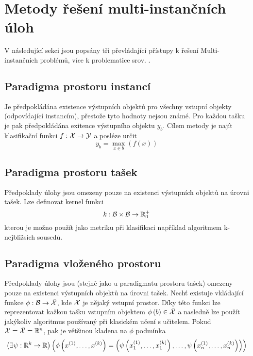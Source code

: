 \section{Metody řešení multi-instančních úloh}

V následující sekci jsou popsány tři převládající přístupy k řešení Multi-instančních problémů, více k problematice srov. \cite{pevny_using_2016}.

\subsection{Paradigma prostoru instancí}
Je předpokládána existence výstupních objektů pro všechny vstupní objekty (odpovídající instancím), přestože tyto hodnoty nejsou známé. Pro každou tašku je pak předpokládána exitence výstupního objektu \( y_b \). Cílem metody je najít klasifikační funkci \( f : \mathcal X \to \mathcal Y \) a posléze určit
\begin{equation}
	y_b = \max_{x \in b} \left( f \left( x \right) \right)
\end{equation}

\subsection{Paradigma prostoru tašek}
Předpoklady úlohy jsou omezeny pouze na existenci výstupních objektů na úrovni tašek. Lze definovat kernel funkci
\begin{equation}
	k : \mathcal B \times \mathcal B \to \mathbb R_0^+
\end{equation}
kterou je možno použít jako metriku při klasifikaci například algoritmem k-nejbližsích sousedů.

\subsection{Paradigma vloženého prostoru}
Předpoklady úlohy jsou (stejně jako u paradigmatu prostoru tašek) omezeny pouze na existenci výstupních objektů na úrovni tašek. Nechť existuje vkládající funkce \( \phi : \mathcal B \to \bar{\mathcal X} \), kde \( \bar{\mathcal X} \) je nějaký vstupní prostor. Díky této funkci lze reprezentovat kažkou tašku vstupním objektem \( \phi \left( b \right) \in \bar{\mathcal X} \) a nasledně lze použít jakýkoliv algoritmus používaný při klasickém učení s učitelem. Pokud \( \mathcal X = \bar{\mathcal X} = \mathbb R^n \), pak je většinou kladena na \( \phi \) podmínka
\begin{equation}
	\left( \exists \psi : \mathbb R^k \to \mathbb R \right) \left( \phi \left( x^{(1)}, \dots, x^{(k)} \right) = \left( \psi \left( x_1^{(1)}, \dots, x_1^{(k)} \right), \dots, \psi \left( x_n^{(1)}, \dots, x_n^{(k)} \right) \right) \right)
\end{equation}

